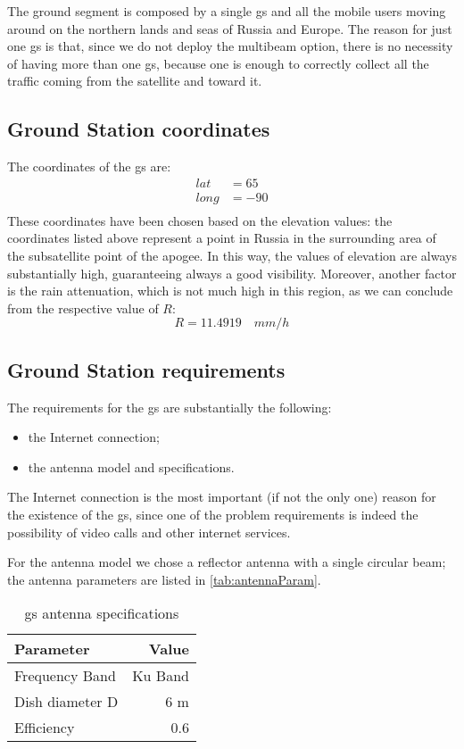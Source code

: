 The ground segment is composed by a single \gls{gs} and all the mobile users moving around on the northern lands and     seas of Russia and Europe. The reason for just one \gls{gs} is that, since we do not deploy the multibeam option, there is no necessity of having more than one \gls{gs}, because one is enough to correctly collect all the traffic coming from the satellite and toward it.
\subsection{Ground Station coordinates}
	The coordinates of the \gls{gs} are:
	\begin{align}
	lat &= 65\\
	long &= -90\\
	\end{align}
	These coordinates have been chosen based on the elevation values: the coordinates listed above represent a point in 				Russia in the surrounding area of the subsatellite point of the apogee. In this way, the values of elevation are always 				substantially high, guaranteeing always a good visibility. Moreover, another factor is the rain attenuation, which is not 			much high in this region, as we can conclude from the respective value of $R$:
	\begin{equation}
	R = 11.4919 \quad mm/h
	\end{equation}
\subsection{Ground Station requirements}
	The requirements for the \gls{gs} are substantially the following:
	\begin{itemize}
		\item the Internet connection;
		\item the antenna model and specifications.
	\end{itemize}

	The Internet connection is the most important (if not the only one) reason for the existence of the \gls{gs}, since one of 			the problem requirements is indeed the possibility of video calls and other internet services.

	For the antenna model we chose a reflector antenna with a single circular beam; the antenna parameters are listed in \autoref{tab:antennaParam}.
	\begin{table}
		\centering
		\begin{tabular}{lr}
		\toprule
		Parameter & Value\\
		\midrule
		Frequency Band & Ku Band\\
		Dish diameter D & 6 m\\
		Efficiency & 0.6\\
		\bottomrule
		\end{tabular}
		\caption{\gls{gs} antenna specifications}
		\label{tab:antennaParam}
	\end{table}

